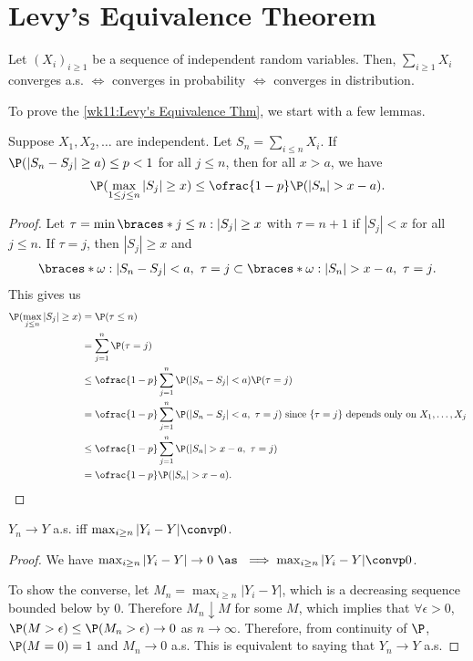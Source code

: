 \documentclass[../aipt.tex]{subfiles}
\begin{document}
\section{Levy's Equivalence Theorem}

\begin{Theorem}\label{wk11:Levy's Equivalence Thm}
Let $(X_i)_{i\geq1}$ be a sequence of independent random variables. Then, $\sum_{i \geq 1} X_i$ converges a.s. $\iff$ converges in probability $\iff$ converges in distribution.
\end{Theorem}

To prove the \cref{wk11:Levy's Equivalence Thm}, we start with a few lemmas.


\begin{Lemma}\label{wk11:lem:Kolineq}
Suppose $X_1,X_2,\ldots$ are independent. Let $S_n=\sum_{i\leq n} X_i$. If $\P(|S_n-S_j|\geq a) \leq p < 1$ for all $j\leq n$, then for all $x > a$, we have
\begin{align*}
\P(\max_{1\leq j\leq n} |S_j| \geq x) \leq \ofrac{1-p} \P(|S_n| > x-a).
\end{align*}
\end{Lemma}
\begin{proof}
Let $\tau = \min\braces*{j\leq n : |S_j|\geq x}$ with $\tau=n+1$ if $|S_j| < x$ for all $j\leq n$. If $\tau=j$, then $|S_j|\geq x$ and 
\begin{align*}
\braces*{\omega : |S_n - S_j| < a,\ \tau=j} \subset \braces*{\omega : |S_n| >x-a,\ \tau=j}.
\end{align*}
This gives us
\begin{align*}
\P(\max_{j\leq n}|S_j| \geq x)
&=\P(\tau\leq n)\\
&=\sum_{j=1}^n \P(\tau=j)\\
&\leq \ofrac{1-p}\sum_{j=1}^n \P(|S_n-S_j|<a)\P(\tau=j)\\
&=\ofrac{1-p}\sum_{j=1}^n \P(|S_n-S_j|<a,\ \tau=j) \text{ since $\{\tau=j\}$ depends only on $X_1,\ldots,X_j$} \\
&\leq \ofrac{1-p}\sum_{j=1}^n \P(|S_n|>x-a,\ \tau=j)\\
&= \ofrac{1-p}\P(|S_n|>x-a).
\end{align*}
\end{proof}

\begin{Lemma}\label{wk11:lem:asiffmaxconvp}
$Y_n\to Y$ a.s. iff $\max_{i\geq n} |Y_i-Y| \convp 0$.
\end{Lemma}
\begin{proof}
We have $\max_{i\geq n} |Y_i-Y| \to 0\ \as\ \implies \max_{i\geq n} |Y_i-Y| \convp 0$.

To show the converse, let $M_n = \max_{i\geq n} |Y_i-Y|$, which is a decreasing sequence bounded below by 0. Therefore $M_n \downarrow M$ for some $M$, which implies that $\forall \epsilon>0$, $\P(M>\epsilon) \leq \P(M_n>\epsilon) \to 0$ as $n\to\infty$. Therefore, from continuity of $\P$, $\P(M=0)=1$ and $M_n\to 0$ a.s. This is equivalent to saying that $Y_n\to Y$ a.s.
\end{proof}
\end{document}
